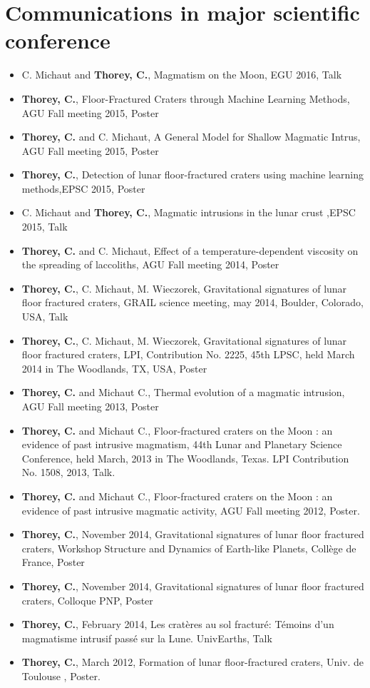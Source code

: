 \documentclass[]{friggeri-cv}
\begin{document}
\section{Communications in major scientific conference}
\begin{itemize}
 \item  C. Michaut and \textbf{Thorey,  C.},  Magmatism on the Moon, EGU 2016,
 Talk
 \item  \textbf{Thorey,  C.},  Floor-Fractured Craters through Machine Learning Methods, AGU Fall meeting 2015,
 Poster
 \item  \textbf{Thorey,  C.} and C. Michaut,  A General Model for Shallow Magmatic Intrus, AGU Fall meeting 2015, Poster
\item  \textbf{Thorey,  C.},  Detection of lunar floor-fractured craters using machine learning methods,EPSC 2015,
 Poster
\item  C. Michaut and \textbf{Thorey,  C.},  Magmatic intrusions in the lunar crust
 ,EPSC 2015,
 Talk
\item \textbf{Thorey,  C.} and  C. Michaut,  Effect of  a temperature-dependent
  viscosity on  the spreading  of laccoliths,  AGU Fall  meeting 2014,
  Poster
\item \textbf{Thorey,  C.}, C.  Michaut, M.  Wieczorek, Gravitational signatures
  of lunar floor  fractured craters, GRAIL science  meeting, may 2014,
  Boulder, Colorado, USA, Talk
\item \textbf{Thorey,  C.}, C.  Michaut, M.  Wieczorek, Gravitational signatures
  of lunar floor  fractured craters, LPI, Contribution  No. 2225, 45th
  LPSC, held March 2014 in The Woodlands, TX, USA, Poster
\item  \textbf{Thorey,  C.}   and Michaut  C.,  Thermal evolution  of a  magmatic
  intrusion, AGU Fall meeting 2013, Poster
\item \textbf{Thorey,  C.} and Michaut C.,  Floor-fractured craters on the Moon :
  an evidence  of past intrusive  magmatism, 44th Lunar  and Planetary
  Science Conference, held  March, 2013 in The  Woodlands, Texas.  LPI
  Contribution No. 1508, 2013, Talk.
\item \textbf{Thorey,  C.} and Michaut C.,  Floor-fractured craters on the Moon :
  an evidence  of past intrusive  magmatic activity, AGU  Fall meeting
  2012, Poster.
\item \textbf{Thorey,  C.}, November 2014, Gravitational signatures of lunar floor
  fractured  craters, Workshop  Structure and  Dynamics of  Earth-like
  Planets, Collège de France, Poster
\item  \textbf{Thorey,  C.}, November  2014, Gravitational  signatures of  lunar
  floor fractured craters, Colloque PNP, Poster
\item \textbf{Thorey,  C.}, February 2014,  Les cratères au sol fracturé: Témoins
  d'un magmatisme intrusif passé sur la Lune.  UnivEarths, Talk
\item  \textbf{Thorey,  C.},  March  2012, Formation  of  lunar  floor-fractured
  craters, Univ. de Toulouse , Poster.
\end{itemize}
\end{document}
